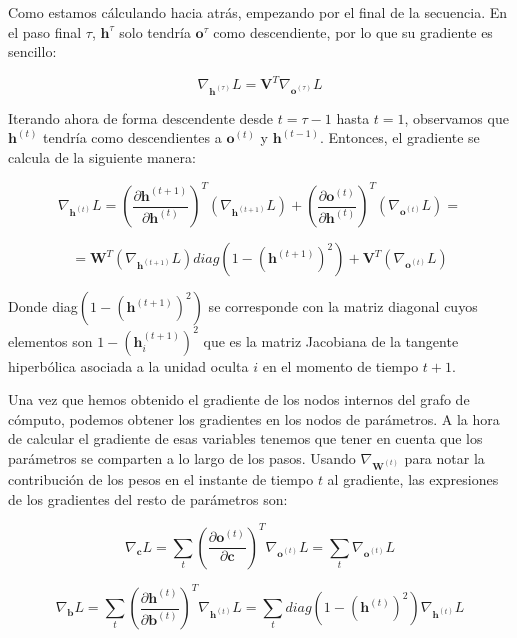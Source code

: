 	Como estamos cálculando hacia atrás, empezando por el final de la secuencia. En el paso final $\tau$, $\textbf{h}^{\tau}$ solo tendría $\textbf{o}^{\tau}$ como descendiente, por lo que su gradiente es sencillo:
	
	\begin{equation}
		\nabla_{\textbf{h}^{(\tau)}}L = \textbf{V}^T \nabla_{\textbf{o}^{(\tau)}}L
	\end{equation}
	
	Iterando ahora de forma descendente desde $t  = \tau - 1$ hasta $t = 1$, observamos que $\textbf{h}^{(t)}$ tendría como descendientes a $\textbf{o}^{(t)}$ y  $\textbf{h}^{(t-1)}$. Entonces, el gradiente se calcula de la siguiente manera:
	
	\begin{equation}
		\nabla_{\textbf{h}^{(t)}}L = \left( \frac{\partial \textbf{h}^{(t+1)}}{\partial \textbf{h}^{(t)}}  \right)^T (\nabla_{\textbf{h}^{(t+1)}}L) + \left(\frac{\partial \textbf{o}^{(t)}}{\partial \textbf{h}^{(t)}} \right)^T(\nabla_{\textbf{o}^{(t)}}L) =
	\end{equation}
	
	$$
		= \textbf{W}^T (\nabla_{\textbf{h}^{(t+1)}}L) diag\left(1 - (\textbf{h}^{(t+1)})^2\right) + \textbf{V}^T(\nabla_{\textbf{o}^{(t)}}L)
	$$
	
	Donde diag$\left(1 - (\textbf{h}^{(t+1)})^2\right) $ se corresponde con la matriz diagonal cuyos elementos son $1 - ( \textbf{h}_i^{(t+1)})^2$ que es la matriz Jacobiana de la tangente hiperbólica asociada a la unidad oculta $i$ en el momento de tiempo $t+1$.
	
	Una vez que hemos obtenido el gradiente de los nodos internos del grafo de cómputo, podemos obtener los gradientes en los nodos de parámetros. A la hora de calcular el gradiente de esas variables tenemos que tener en cuenta que los parámetros se comparten a lo largo de los pasos. Usando $\nabla_{\textbf{W}^{(t)}}$ para notar la contribución de los pesos en el instante de tiempo $t$ al gradiente, las expresiones de los gradientes del resto de parámetros son:
	
	\begin{equation}
		\nabla_{\textbf{c}}L = \sum_{t}\left( \frac{\partial \textbf{o}^{(t)}}{\partial \textbf{c}} \right)^T \nabla_{\textbf{o}^{(t)}}L = \sum_{t} \nabla_{\textbf{o}^{(t)}}L
	\end{equation}
	
	\begin{equation}
	\nabla_{\textbf{b}}L = \sum_{t}\left( \frac{\partial \textbf{h}^{(t)}}{\partial \textbf{b}^{(t)}} \right)^T \nabla_{\textbf{h}^{(t)}}L = \sum_{t} diag\left(1 - \left(\textbf{h}^{(t)}\right)^2\right)    \nabla_{\textbf{h}^{(t)}}L
	\end{equation}
	
